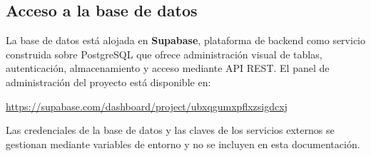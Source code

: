 \documentclass[11pt,letterpaper]{article}
\begin{document}
\subsection{Acceso a la base de datos}
La base de datos está alojada en \textbf{Supabase}, plataforma de backend como servicio construida sobre PostgreSQL que ofrece administración visual de tablas, autenticación, almacenamiento y acceso mediante API REST. El panel de administración del proyecto está disponible en:

\begin{center}
\url{https://supabase.com/dashboard/project/ubxqgumxpflxzsigdcxj}
\end{center}

Las credenciales de la base de datos y las claves de los servicios externos se gestionan mediante variables de entorno y no se incluyen en esta documentación.
\end{document}
